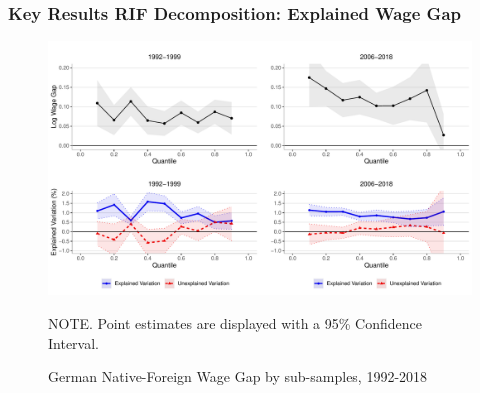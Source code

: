 \documentclass[10pt]{beamer}
\begin{document}
\begin{frame}
	\frametitle{Key Results RIF Decomposition: Explained Wage Gap}
	
	
	\begin{figure}[H]
		\begin{minipage}{0.95\textwidth} %
			\includegraphics[scale=0.4]{nfgap_t} \\
			{\footnotesize \tiny NOTE. \textemdash Point estimates are displayed with a 95\% Confidence Interval. \par}
			\caption{\centering German Native-Foreign Wage Gap by sub-samples, 1992-2018 \label{fig:wgap_subs}}
		\end{minipage}
	\end{figure}
	
	
	
\end{frame}
\end{document}
